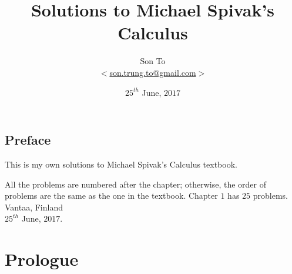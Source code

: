 \documentclass[a4paper,11pt]{memoir}
\newcommand{\note}[1]{\emph{#1}}
\theoremstyle{plain} \newtheorem{id}{Lemma}
\theoremstyle{definition} \newtheorem{pr}{Problem}[chapter]
\theoremstyle{remark}\newtheorem*{ab}{Remark}
\begin{document}
  \title{Solutions to Michael Spivak's Calculus}
  \author{Son To\\
  $<$\href{mailto:son.trung.to@gmail.com}%
  {son.trung.to@gmail.com}$>$}
  \date{$25^{th}$ June, $2017$}

  \maketitle
  \makeatletter
  \def\cleardoublepage{\clearpage\if@twoside
  \ifodd\c@page\else
    \hbox{}
    \vspace*{\fill}
    \begin{center}
      \doublenote
    \end{center}
    \vspace*{\fill}
    \thispagestyle{empty}
    \newpage
    \if@twocolumn\hbox{}\newpage\fi\fi\fi
}
\newcommand{\mylabel}[2]{#2\def\@currentlabel{#2}\label{#1}}
\def\@endpart{\vfill\newpage
              \if@twoside
                \if@openright
                  \null
                  \thispagestyle{empty}%
\vspace*{\fill}%
\begin{quote}%
  \partnote
\end{quote}%
\vspace*{\fill}%
                  \newpage
                \fi
              \fi
              \if@tempswa
                \twocolumn
              \fi
}
\newcommand{\partnote}{}
\newcommand{\doublenote}{}

\newcommand\binomialCoefficient[2]{%
  \c@pgf@counta=#1 %
  \c@pgf@countb=#2 %
  \c@pgf@countc=\c@pgf@counta%
  \advance \c@pgf@countc by-\c@pgf@countb%
  \ifnum\c@pgf@countb>\c@pgf@countc%
    \c@pgf@countb=\c@pgf@countc%
  \fi%
  \c@pgf@countc=1 %
  \c@pgf@countd=0 %
  \pgfmathloop %
    \ifnum\c@pgf@countd<\c@pgf@countb%
    \multiply \c@pgf@countc by\c@pgf@counta%
    \advance  \c@pgf@counta by-1%
    \advance  \c@pgf@countd by1%
    \divide   \c@pgf@countc by\c@pgf@countd%
  \repeatpgfmathloop%
  \the\c@pgf@countc%
}
\makeatother

\renewcommand{\doublenote}{%
\note{On maailmalle}}
\frontmatter
  \chapter{Preface}
    This is my own solutions to Michael Spivak's Calculus
    textbook.
    \par
    All the problems are numbered after the chapter;
    otherwise, the order of problems are the same as
    the one in the textbook.
    Chapter $1$ has $25$ problems.
    \flushright
    Vantaa, Finland \\
    $25^{th}$ June, $2017$.
  \clearpage
  \tableofcontents

\mainmatter
  \renewcommand{\partnote}{
  This page is intentionally left blank.
  }
  \part{Prologue}
    
    
\end{document}
